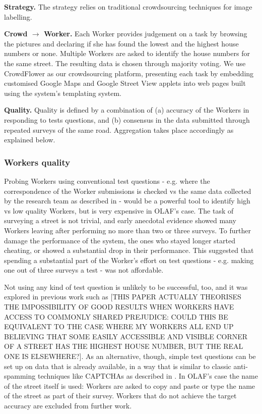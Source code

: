 \textbf{Strategy.} 
The strategy relies on traditional crowdsourcing techniques for image labelling.

\textbf{Crowd $\rightarrow$ Worker.} Each Worker provides judgement on a task by browsing the pictures and declaring if she has found the lowest and the highest house numbers or none. Multiple Workers are asked to identify the house numbers for the same street. The resulting data is chosen through majority voting. We use CrowdFlower as our crowdsourcing platform, presenting each task by embedding customised Google Maps and Google Street View applets into web pages built using the system's templating system. 

\textbf{Quality.} Quality is defined by a combination of (a) accuracy of the Workers in responding to tests questions, and (b) consensus in the data submitted through repeated surveys of the same road. Aggregation takes place accordingly as explained below.

\subsubsection{Workers quality}
    
Probing Workers using conventional test questions - e.g. where the correspondence of the Worker submissions is checked vs the same data collected by the research team as described in \cite{Kittur:2008gj} - would be a powerful tool to identify high vs low quality Workers, but is very expensive in OLAF's case. The task of surveying a street is not trivial, and early anecdotal evidence showed many Workers leaving after performing no more than two or three surveys. To further damage the performance of the system, the ones who stayed longer started cheating, or showed a substantial drop in their performance. This suggested that spending a substantial part of the Worker's effort on test questions - e.g. making one out of three surveys a test - was not affordable.

Not using any kind of test question is unlikely to be successful, too, and it was explored in previous work such as \cite{DellaPenna:tf} [THIS PAPER ACTUALLY THEORISES THE IMPOSSIBILITY OF GOOD RESULTS WHEN WORKERS HAVE ACCESS TO COMMONLY SHARED PREJUDICE: COULD THIS BE EQUIVALENT TO THE CASE WHERE MY WORKERS ALL END UP BELIEVING THAT SOME EASILY ACCESSIBLE AND VISIBLE CORNER OF A STREET HAS THE HIGHEST HOUSE NUMBER, BUT THE REAL ONE IS ELSEWHERE?]. As an alternative, though, simple test questions can be set up on data that is already available, in a way that is similar to classic anti-spamming techniques like CAPTCHAs as described in \cite{Difallah:2012ty}. In OLAF's case the name of the street itself is used: Workers are asked to copy and paste or type the name of the street as part of their survey. Workers that do not achieve the target accuracy are excluded from further work.

